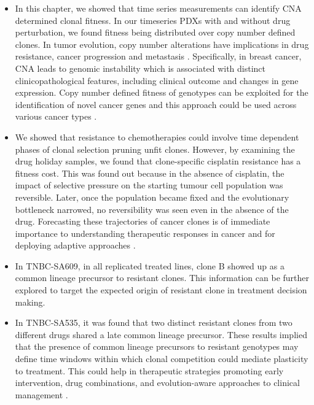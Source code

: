 \begin {itemize}

\item In this chapter, we showed that time series measurements can identify CNA determined clonal fitness. In our timeseries PDXs with and without drug perturbation, we found fitness being distributed over copy number defined clones. In tumor evolution, copy number alterations have implications in drug resistance, cancer progression and metastasis \cite{ bielski2018genome, beroukhim2010landscape}. Specifically, in breast cancer, CNA leads to genomic instability which is associated with distinct clinicopathological features, including clinical outcome and changes in gene expression. Copy number defined fitness of genotypes can be exploited for the identification of novel cancer genes and this approach could be used across various cancer types \cite{ lopez2020interplay}.


\item We showed that resistance to chemotherapies could involve time dependent phases of clonal selection pruning unfit clones. However, by examining the drug holiday samples, we found that clone-specific cisplatin resistance has a fitness cost. This was found out because in the absence of cisplatin, the impact of  selective pressure on the starting tumour cell population was reversible. Later, once the population became fixed and the evolutionary bottleneck narrowed, no reversibility was seen even in the absence of the drug. Forecasting these trajectories of cancer clones is of immediate importance to understanding therapeutic responses in cancer and for deploying adaptive approaches \cite{Vasan2019-mt}. 


\item In TNBC-SA609, in all replicated treated lines,  clone B showed up as a common lineage precursor to resistant clones.  This information can be further explored to target the expected origin of resistant clone in treatment decision making.

\item In TNBC-SA535, it was found that two distinct resistant clones from two different drugs shared a late common lineage precursor.  These results implied that the presence of common lineage precursors to resistant genotypes may define time windows within which clonal competition could mediate plasticity to treatment. This could help in therapeutic strategies promoting early intervention, drug combinations, and evolution-aware approaches to clinical management \cite{Acar2020-tf}.
\end {itemize}



